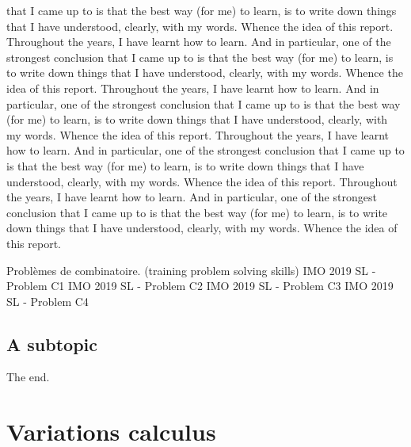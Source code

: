 \documentclass[12pt]{book}
\begin{document}
that I came up to is that the best way (for me) to learn, is to write down things that I have understood, clearly, with my words. Whence the idea of this report. Throughout the years, I have learnt how to learn. And in particular, one of the strongest conclusion that I came up to is that the best way (for me) to learn, is to write down things that I have understood, clearly, with my words. Whence the idea of this report. Throughout the years, I have learnt how to learn. And in particular, one of the strongest conclusion that I came up to is that the best way (for me) to learn, is to write down things that I have understood, clearly, with my words. Whence the idea of this report. Throughout the years, I have learnt how to learn. And in particular, one of the strongest conclusion that I came up to is that the best way (for me) to learn, is to write down things that I have understood, clearly, with my words. Whence the idea of this report. Throughout the years, I have learnt how to learn. And in particular, one of the strongest conclusion that I came up to is that the best way (for me) to learn, is to write down things that I have understood, clearly, with my words. Whence the idea of this report. 



Problèmes de combinatoire. (training problem solving skills)
IMO 2019 SL - Problem C1
IMO 2019 SL - Problem C2
IMO 2019 SL - Problem C3
IMO 2019 SL - Problem C4


\section{A subtopic}
The end.


\chapter*{Variations calculus}
\end{document}
